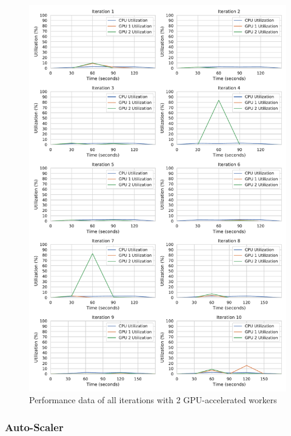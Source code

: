 \begin{figure}[h]
\centering
\includegraphics[scale=0.4]{images/07_evaluation/regression/gpu2_performance}
\caption{Performance data of all iterations with 2 GPU-accelerated workers}
\label{fig:appendix_eval_regression_gpu2}
\end{figure}

\subsubsection{Auto-Scaler}

